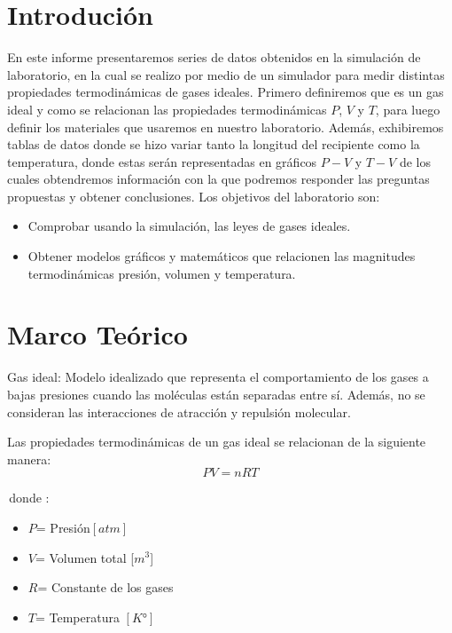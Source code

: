 \documentclass[]{article}
\begin{document}
\tableofcontents

\section{Introdución}
En este informe presentaremos series de datos obtenidos en la simulación de laboratorio, en la cual se realizo por medio de un simulador para medir distintas propiedades termodinámicas de gases ideales.
 Primero definiremos que es un gas ideal y como se relacionan las propiedades termodinámicas $P$, $V$ y $T$, para luego definir los materiales que usaremos en nuestro laboratorio.
Además, exhibiremos tablas de datos donde se hizo variar tanto la longitud del recipiente como la temperatura, donde estas serán representadas en gráficos $P-V$ y $T-V$ de los cuales obtendremos información con la que podremos responder las preguntas propuestas y obtener conclusiones.
Los objetivos del laboratorio son:
 \begin{itemize}  %
      \item Comprobar usando la simulación, las leyes de gases ideales.
      \item Obtener modelos gráficos y matemáticos que relacionen las magnitudes termodinámicas presión,
      volumen y temperatura.
\end{itemize}


\section{Marco Teórico}

Gas ideal: Modelo idealizado que representa el comportamiento 
de los gases a bajas presiones cuando  las moléculas están separadas entre sí. Además, no se
consideran las interacciones de atracción y repulsión molecular.


Las propiedades termodinámicas de un gas ideal se relacionan de la siguiente manera:
\begin{equation*}
      PV=nRT
\end{equation*}

\,donde :
\begin{itemize}
      \item $P$= Presión$[atm]$
      \item $V$= Volumen total [$m^3$]
      \item $R$= Constante de los gases
      \item $T$= Temperatura $[K°]$
\end{itemize}
\end{document}
